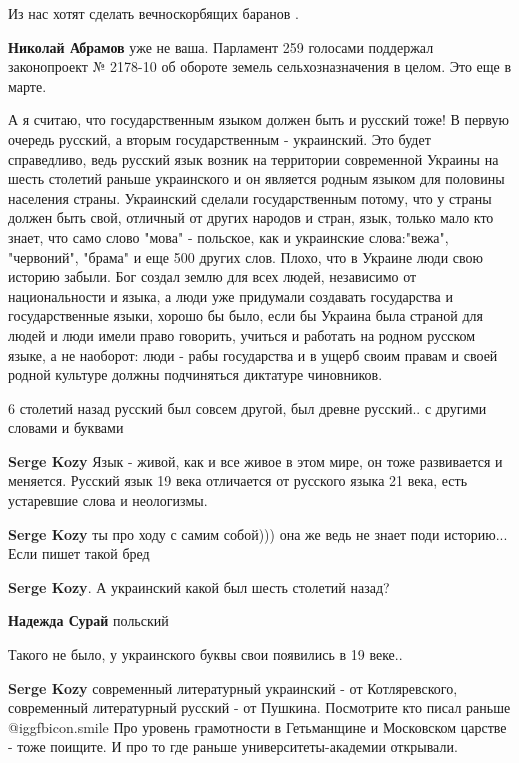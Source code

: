 \begin{itemize}
\begin{itemize}
Из нас хотят сделать вечноскорбящих баранов .

\textbf{Николай Абрамов} уже не ваша. Парламент 259 голосами поддержал законопроект № 2178-10 об обороте земель сельхозназначения в целом. Это еще в марте.
\end{itemize} %


А я считаю, что государственным языком должен быть и русский тоже! В первую
очередь русский, а вторым государственным - украинский. Это будет справедливо,
ведь русский язык возник на территории современной Украины на шесть столетий
раньше украинского и он является родным языком для половины населения страны.
Украинский сделали государственным потому, что у страны должен быть свой,
отличный от других народов и стран, язык, только мало кто знает, что само слово
"мова" - польское, как и украинские слова:"вежа", "червоний", "брама" и еще 500
других слов. Плохо, что в Украине люди свою историю забыли. Бог создал землю
для всех людей, независимо от национальности и языка, а люди уже придумали
создавать государства и государственные языки, хорошо бы было, если бы Украина
была страной для людей и люди имели право говорить, учиться и работать на
родном русском языке, а не наоборот: люди - рабы государства и в ущерб своим
правам и своей родной культуре должны подчиняться диктатуре чиновников.

\begin{itemize} %
6 столетий назад русский был совсем другой, был древне русский.. с другими словами и буквами

\textbf{Serge Kozy} Язык - живой, как и все живое в этом мире, он тоже развивается и меняется. Русский язык 19 века отличается от русского языка 21 века, есть устаревшие слова и неологизмы.

\textbf{Serge Kozy} ты про ходу с самим собой))) она же ведь не знает поди историю... Если пишет такой бред

\textbf{Serge Kozy}. А украинский какой был шесть столетий назад?

\textbf{Надежда Сурай} польский

Такого не было, у украинского буквы свои появились в 19 веке..

\textbf{Serge Kozy} современный литературный украинский - от Котляревского, современный литературный русский - от Пушкина.
Посмотрите кто писал раньше  @igg{fbicon.smile} 
Про уровень грамотности в Гетьманщине и Московском царстве - тоже поищите. И про то где раньше университеты-академии открывали.


\end{itemize}
\end{itemize}
